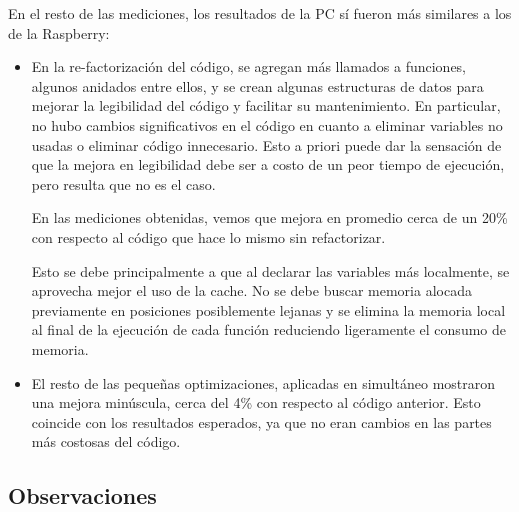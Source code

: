 \documentclass{article}
\begin{document}
En el resto de las mediciones, los resultados de la PC sí fueron más similares a los de la Raspberry:
\begin{itemize}
\item \hspace{0.2cm} En la re-factorización del código, se agregan más llamados a funciones, algunos anidados entre ellos, y se crean algunas estructuras de datos para mejorar la legibilidad del código y facilitar su mantenimiento. En particular, no hubo cambios significativos en el código en cuanto a eliminar variables no usadas o eliminar código innecesario. Esto a priori puede dar la sensación de que la mejora en legibilidad debe ser a costo de un peor tiempo de ejecución, pero resulta que no es el caso. 

\hspace{0.2cm} En las mediciones obtenidas, vemos que mejora en promedio cerca de un 20\% con respecto al código que hace lo mismo sin refactorizar.

\hspace{0.2cm} Esto se debe principalmente a que al declarar las variables más localmente, se aprovecha mejor el uso de la cache. No se debe buscar memoria alocada previamente en posiciones posiblemente lejanas y se elimina la memoria local al final de la ejecución de cada función reduciendo ligeramente el consumo de memoria. 

\item \hspace{0.2cm} El resto de las pequeñas optimizaciones, aplicadas en simultáneo mostraron una mejora minúscula, cerca del 4\% con respecto al código anterior. Esto coincide con los resultados esperados, ya que no eran cambios en las partes más costosas del código.
\end{itemize}

\subsection{Observaciones}
\end{document}
